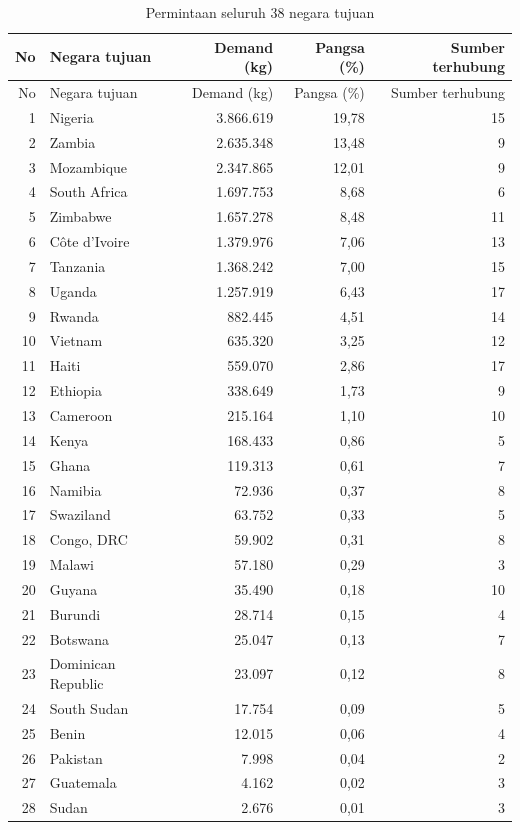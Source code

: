 \begin{longtable}{rlrrr}\caption{Permintaan seluruh 38 negara tujuan}\label{tab:demandfull}\\\toprule No & Negara tujuan & Demand (kg) & Pangsa (\%) & Sumber terhubung \\ \midrule\endfirsthead
\toprule No & Negara tujuan & Demand (kg) & Pangsa (\%) & Sumber terhubung \\ \midrule\endhead
1 & Nigeria & 3.866.619 & 19,78 & 15 \\
2 & Zambia & 2.635.348 & 13,48 & 9 \\
3 & Mozambique & 2.347.865 & 12,01 & 9 \\
4 & South Africa & 1.697.753 & 8,68 & 6 \\
5 & Zimbabwe & 1.657.278 & 8,48 & 11 \\
6 & Côte d'Ivoire & 1.379.976 & 7,06 & 13 \\
7 & Tanzania & 1.368.242 & 7,00 & 15 \\
8 & Uganda & 1.257.919 & 6,43 & 17 \\
9 & Rwanda & 882.445 & 4,51 & 14 \\
10 & Vietnam & 635.320 & 3,25 & 12 \\
11 & Haiti & 559.070 & 2,86 & 17 \\
12 & Ethiopia & 338.649 & 1,73 & 9 \\
13 & Cameroon & 215.164 & 1,10 & 10 \\
14 & Kenya & 168.433 & 0,86 & 5 \\
15 & Ghana & 119.313 & 0,61 & 7 \\
16 & Namibia & 72.936 & 0,37 & 8 \\
17 & Swaziland & 63.752 & 0,33 & 5 \\
18 & Congo, DRC & 59.902 & 0,31 & 8 \\
19 & Malawi & 57.180 & 0,29 & 3 \\
20 & Guyana & 35.490 & 0,18 & 10 \\
21 & Burundi & 28.714 & 0,15 & 4 \\
22 & Botswana & 25.047 & 0,13 & 7 \\
23 & Dominican Republic & 23.097 & 0,12 & 8 \\
24 & South Sudan & 17.754 & 0,09 & 5 \\
25 & Benin & 12.015 & 0,06 & 4 \\
26 & Pakistan & 7.998 & 0,04 & 2 \\
27 & Guatemala & 4.162 & 0,02 & 3 \\
28 & Sudan & 2.676 & 0,01 & 3 \\

\end{longtable}
